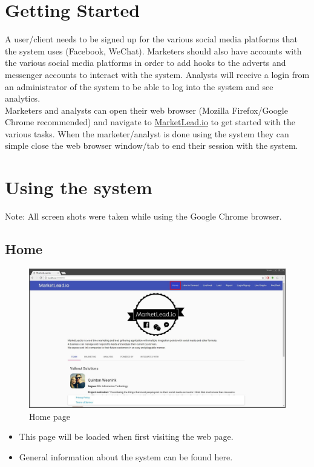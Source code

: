 \documentclass{article}
\begin{document}
	\section{Getting Started}
		A user/client needs to be signed up for the various social media platforms that the system uses (Facebook, WeChat).
		Marketers should also have accounts with the various social media platforms in order to add hooks to the adverts and messenger accounts to interact with the system.
		Analysts will receive a login from an administrator of the system to be able to log into the system and see analytics.\\
		Marketers and analysts can open their web browser (Mozilla Firefox/Google Chrome recommended) and navigate to \href{https://marketlead.herokuapp.com}{MarketLead.io} to get started with the various tasks.
		When the marketer/analyst is done using the system they can simple close the web browser window/tab to end their session with the system.

	\section{Using the system}
		Note: All screen shots were taken while using the Google Chrome browser.
		\subsection{Home}
			\begin{figure}[H]
				\includegraphics[width=\textwidth]{images/home.jpg}
				\caption{Home page}
			\end{figure}

			\begin{itemize}
				\item This page will be loaded when first visiting the web page.
				\item General information about the system can be found here.
			\end{itemize}
\end{document}
